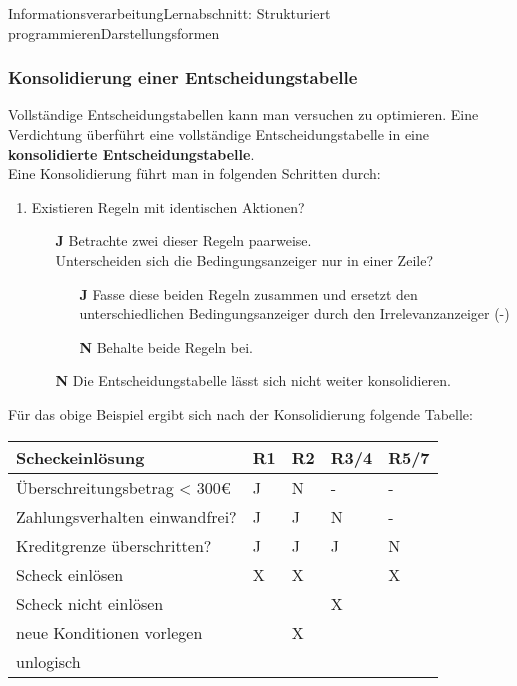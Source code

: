 \documentclass[11pt,oneside,openany,headings=optiontotoc,11pt,numbers=noenddot]{article}
\begin{document}
\begin{worksheet}{Informationsverarbeitung}{Lernabschnitt: Strukturiert programmieren}{Darstellungsformen}
		\subsubsection{Konsolidierung einer Entscheidungstabelle}
		Vollständige Entscheidungstabellen kann man versuchen zu optimieren. Eine Verdichtung überführt eine vollständige Entscheidungstabelle in eine \textbf{konsolidierte Entscheidungstabelle}.\\
		Eine Konsolidierung führt man in folgenden Schritten durch:
		\begin{enumerate}
			\item Existieren Regeln mit identischen Aktionen?
			\begin{itemize}
				\item[\textbf{J}] Betrachte zwei dieser Regeln paarweise.\\
				Unterscheiden sich die Bedingungsanzeiger nur in einer Zeile?
				\begin{itemize}
					\item[\textbf{J}] Fasse diese beiden Regeln zusammen und ersetzt den unterschiedlichen Bedingungsanzeiger durch den Irrelevanzanzeiger (\grqq{}-\grqq{})
					\item[\textbf{N}] Behalte beide Regeln bei.
				\end{itemize}
				\item[\textbf{N}] Die Entscheidungstabelle lässt sich nicht weiter konsolidieren.
			\end{itemize}
		\end{enumerate}
		Für das obige Beispiel ergibt sich nach der Konsolidierung folgende Tabelle:\\
		\begin{tabularx}{\textwidth}{|l||M|M|M|M|}
			\hline
			\textbf{Scheckeinlösung} & \textbf{R1} & \textbf{R2} & \textbf{R3/4} & \textbf{R5/7}\\
			\hline
			Überschreitungsbetrag < 300\euro & J & N & - & - \\
			\hline
			Zahlungsverhalten einwandfrei? & J & J & N & - \\
			\hline
			Kreditgrenze überschritten? & J & J & J & N \\
			\hline
			\hline
			Scheck einlösen & X & X & & X \\
			\hline
			Scheck nicht einlösen & & & X & \\
			\hline
			neue Konditionen vorlegen & & X & & \\
			\hline
			unlogisch & & & & \\
			\hline
		\end{tabularx}

\end{worksheet}
\end{document}
